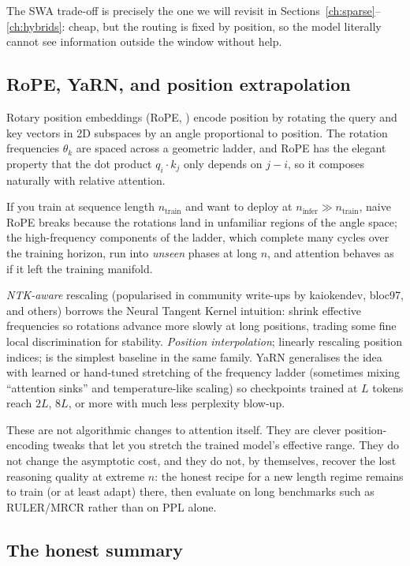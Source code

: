 The SWA trade-off is precisely the one we will revisit in Sections~\ref{ch:sparse}--\ref{ch:hybrids}: cheap,
but the routing is fixed by position, so the model literally cannot see
information outside the window without help.

\subsection{RoPE, YaRN, and position extrapolation}

Rotary position embeddings (RoPE, \citealp{su2021rope}) encode position by
rotating the query and key vectors in 2D subspaces by an angle
proportional to position. The rotation frequencies \(\theta_k\) are spaced
across a geometric ladder, and RoPE has the elegant property that the dot
product \(q_i \cdot k_j\) only depends on \(j - i\), so it composes
naturally with relative attention.

If you train at sequence length \(n_{\text{train}}\) and want to deploy at
\(n_{\text{infer}} \gg n_{\text{train}}\), naive RoPE breaks because the
rotations land in unfamiliar regions of the angle space; the
high-frequency components of the ladder, which complete many cycles over
the training horizon, run into \emph{unseen} phases at long \(n\), and
attention behaves as if it left the training manifold.

\emph{NTK-aware} rescaling (popularised in community write-ups by
kaiokendev, bloc97, and others) borrows the Neural Tangent Kernel
intuition: shrink effective frequencies so rotations advance more slowly
at long positions, trading some fine local discrimination for stability.
\emph{Position interpolation}; linearly rescaling position indices; is
the simplest baseline in the same family. YaRN
\citep{peng2023yarn} generalises the idea with learned or hand-tuned
stretching of the frequency ladder (sometimes mixing ``attention sinks''
and temperature-like scaling) so checkpoints trained at \(L\) tokens
reach \(2L\), \(8L\), or more with much less perplexity blow-up.

These are not algorithmic changes to attention itself. They are clever
position-encoding tweaks that let you stretch the trained model's
effective range. They do not change the asymptotic cost, and they do
not, by themselves, recover the lost reasoning quality at extreme \(n\):
the honest recipe for a new length regime remains to train (or at least
adapt) there, then evaluate on long benchmarks such as RULER/MRCR rather
than on PPL alone.

\subsection{The honest summary}

